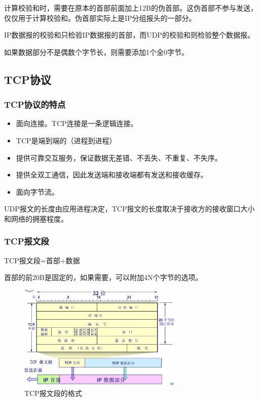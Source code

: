 \documentclass[12pt, a4paper, oneside]{ctexart}
\begin{document}
计算校验和时，需要在原本的首部前面加上12B的伪首部。这伪首部不参与发送，仅仅用于计算校验和。伪首部实际上是IP分组报头的一部分。

IP数据报的校验和只检验IP数据报的首部，而UDP的校验和则检验整个数据报。

如果数据部分不是偶数个字节长，则需要添加1个全0字节。

\subsection{TCP协议}

\subsubsection{TCP协议的特点}

\begin{itemize}
    \item 面向连接。TCP连接是一条逻辑连接。
    \item TCP是端到端的（进程到进程）
    \item 提供可靠交互服务，保证数据无差错、不丢失、不重复、不失序。
    \item 提供全双工通信，因此发送端和接收端都有发送和接收缓存。
    \item 面向字节流。
\end{itemize}

UDP报文的长度由应用进程决定，TCP报文的长度取决于接收方的接收窗口大小和网络的拥塞程度。

\subsubsection{TCP报文段}

TCP报文段=首部+数据

首部的前20B是固定的，如果需要，可以附加4N个字节的选项。

\begin{figure}[h]
    \centering
    \includegraphics[width=0.7\textwidth]{./images/tcp_segment.png}
    \caption{TCP报文段的格式}
\end{figure}
\end{document}
